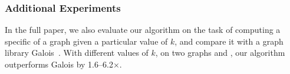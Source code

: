 \subsubsection{Additional Experiments} 
In the full paper, 
we also evaluate our algorithm on the task of computing a specific \kcore{} of a graph given a particular value of $k$, and compare it with a graph library Galois~\cite{Nguyen2014}. 
With different values of $k$, on two graphs \OK{} and \TW{}, our algorithm outperforms Galois by 1.6--6.2$\times$. 













%



